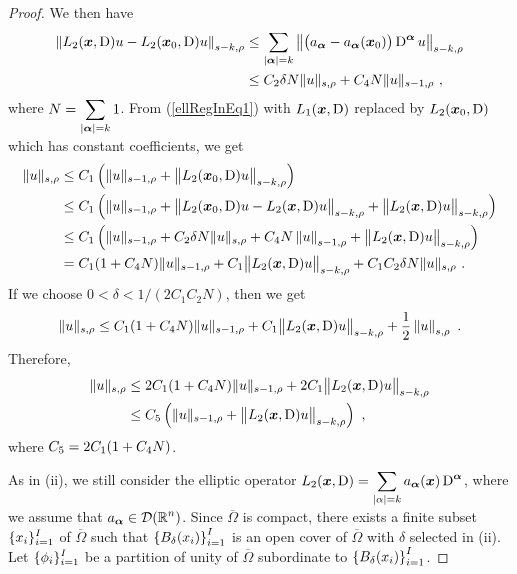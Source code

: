 \begin{proof}
We then have
\begin{align*}
\left\| L_2({\bm{x}},\operatorname{D}) u - L_2({\bm{x}}_0,\operatorname{D}) u\right\|_{s-k,\rho}
&\leq \sum_{|{\bm{\alpha}}|=k} \left\| \big(a_{{\bm{\alpha}}}
- a_{{\bm{\alpha}}}({\bm{x}}_0)\big)
\operatorname{D}^{{\bm{\alpha}}} u \right\|_{s-k,\rho} \\
&\leq C_2 \delta N \| u \|_{s,\rho}
+C_4 N \| u \|_{s-1,\rho} \ ,
\end{align*}
where $\displaystyle N = \sum_{|{\bm{\alpha}}|=k} 1$.  From
(\ref{ellRegInEq1}) with $L_1({\bm{x}},\operatorname{D})$ replaced by
$L_2({\bm{x}}_0,\operatorname{D})$ which has constant coefficients, we get
\begin{align*}
\|u\|_{s,\rho}
&\leq C_1 \left( \|u\|_{s-1,\rho} +
\big\|L_2({\bm{x}}_0,\operatorname{D})u\big\|_{s-k,\rho}\right) \\
&\leq C_1 \left( \|u\|_{s-1,\rho} +
\big\|L_2({\bm{x}}_0,\operatorname{D})u - L_2({\bm{x}},\operatorname{D})u\big\|_{s-k,\rho}
+\big\|L_2({\bm{x}},\operatorname{D})u\big\|_{s-k,\rho}\right) \\
&\leq C_1 \left( \|u\|_{s-1,\rho} + C_2 \delta N \| u \|_{s,\rho}
+C_4 N \left\| u \right\|_{s-1,\rho} 
+\big\|L_2({\bm{x}},\operatorname{D})u\big\|_{s-k,\rho}\right) \\
& = C_1 (1+C_4 N) \|u\|_{s-1,\rho} +
C_1 \big\|L_2({\bm{x}},\operatorname{D})u\big\|_{s-k,\rho}
+ C_1 C_2 \delta N \| u \|_{s,\rho} \ .
\end{align*}
If we choose $0<\delta < 1/(2C_1C_2 N)$, then we get
\[
\|u\|_{s,\rho}
\leq C_1 (1+C_4 N) \|u\|_{s-1,\rho} +
C_1 \big\|L_2({\bm{x}},\operatorname{D})u\big\|_{s-k,\rho}
+ \frac{1}{2} \left\| u \right\|_{s,\rho} \ .
\]
Therefore,
\begin{equation} \label{ellRegInEq3}
\begin{split}
\|u\|_{s,\rho}
&\leq 2 C_1 (1+C_4 N) \|u\|_{s-1,\rho} +
2C_1 \big\|L_2({\bm{x}},\operatorname{D})u\big\|_{s-k,\rho} \\
&\leq C_5 \left( \|u\|_{s-1,\rho} +
\big\|L_2({\bm{x}},\operatorname{D})u\big\|_{s-k,\rho} \right) \ ,
\end{split}
\end{equation}
where $\displaystyle C_5 = 2C_1(1+C_4N)$.

 As in (ii), we still consider the elliptic operator
$\displaystyle L_2({\bm{x}},\operatorname{D})
= \sum_{|\alpha|= k} a_{{\bm{\alpha}}}({\bm{x}}) \operatorname{D}^{{\bm{\alpha}}}$,
where we assume that $\displaystyle a_{{\bm{\alpha}}} \in \mathcal{D}(\mathbb{R}^n)$.
Since $\overline{\Omega}$ is compact, there exists a finite subset 
$\displaystyle \{x_i\}_{i=1}^I$ of $\overline{\Omega}$ such that
$\displaystyle \left\{B_\delta(x_i)\right\}_{i=1}^I$ is an open cover
of $\overline{\Omega}$ with $\delta$ selected in (ii).  Let
$\displaystyle \{\phi_i\}_{i=1}^I$ be a
partition of unity of $\overline{\Omega}$ subordinate to
$\displaystyle \left\{B_\delta(x_i)\right\}_{i=1}^I$.


\end{proof}
